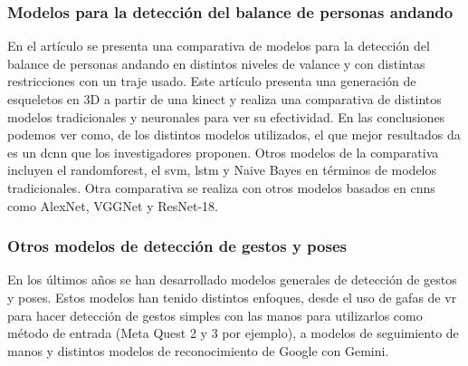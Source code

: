 \subsubsection{Modelos para la detección del balance de personas andando}

En el artículo \cite{combining3dskeleton} se presenta una comparativa de modelos para la detección del balance de personas andando en distintos niveles de valance y con distintas restricciones con un traje usado. Este artículo presenta una generación de esqueletos en 3D a partir de una kinect y realiza una comparativa de distintos modelos tradicionales y neuronales para ver su efectividad. En las conclusiones podemos ver como, de los distintos modelos utilizados, el que mejor resultados da es un \gls{dcnn} que los investigadores proponen. Otros modelos de la comparativa incluyen el \gls{randomforest}, el \gls{svm}, \gls{lstm} y Naive Bayes en términos de modelos tradicionales. Otra comparativa se realiza con otros modelos basados en \glspl{cnn} como AlexNet, VGGNet y ResNet-18.

\subsubsection{Otros modelos de detección de gestos y poses}

En los últimos años se han desarrollado modelos generales de detección de gestos y poses. Estos modelos han tenido distintos enfoques, desde el uso de gafas de \gls{vr} para hacer detección de gestos simples con las manos para utilizarlos como método de entrada (Meta Quest 2 y 3 por ejemplo), a modelos de seguimiento de manos y distintos modelos de reconocimiento de Google con Gemini.